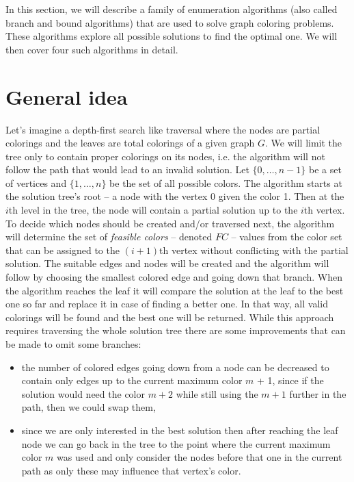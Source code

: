 In this section, we will describe a family of enumeration algorithms (also called branch and bound algorithms) that are used to solve graph coloring problems. These algorithms explore all possible solutions to find the optimal one. We will then cover four such algorithms in detail.

\section{General idea}

Let's imagine a depth-first search like traversal where the nodes are partial colorings and the leaves are total colorings of a given graph $G$. We will limit the tree only to contain proper colorings on its nodes, i.e. the algorithm will not follow the path that would lead to an invalid solution. Let $\{0, \dots, n - 1\}$ be a set of vertices and $\{1, \dots, n\}$ be the set of all possible colors. The algorithm starts at the solution tree's root -- a node with the vertex $0$ given the color 1. Then at the $i$th level in the tree, the node will contain a partial solution up to the $i$th vertex. To decide which nodes should be created and/or traversed next, the algorithm will determine the set of \textit{feasible colors} -- denoted $FC$ -- values from the color set that can be assigned to the $(i+1)$th vertex without conflicting with the partial solution. The suitable edges and nodes will be created and the algorithm will follow by choosing the smallest colored edge and going down that branch. When the algorithm reaches the leaf it will compare the solution at the leaf to the best one so far and replace it in case of finding a better one. In that way, all valid colorings will be found and the best one will be returned.
While this approach requires traversing the whole solution tree there are some improvements that can be made to omit some branches:
\begin{itemize}    
    \item the number of colored edges going down from a node can be decreased to contain only edges up to the current maximum color $m$ + 1, since if the solution would need the color $m + 2$ while still using the $m+1$ further in the path, then we could swap them, 
    \item since we are only interested in the best solution then after reaching the leaf node we can go back in the tree to the point where the current maximum color $m$ was used and only consider the nodes before that one in the current path as only these may influence that vertex's color.
\end{itemize}
